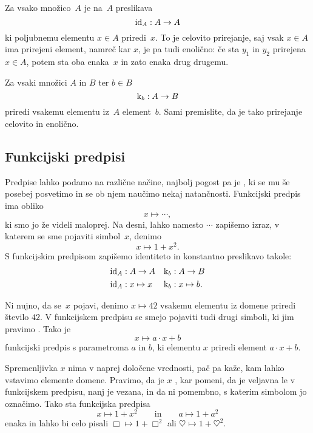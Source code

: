Za vsako množico~$A$ je  na~$A$ preslikava
%
\begin{equation*}
  \id[A] : A \to A
\end{equation*}
%
ki poljubnemu elementu $x \in A$ priredi~$x$. To je celovito prirejanje, saj vsak
$x \in A$ ima prirejeni element, namreč kar $x$, je pa tudi enolično: če sta $y_1$ in
$y_2$ prirejena $x \in A$, potem sta oba enaka~$x$ in zato enaka drug drugemu.

Za vsaki množici $A$ in $B$ ter $b \in B$ 
%
\begin{equation*}
  \konst{b} : A \to B
\end{equation*}
%
priredi vsakemu elementu iz~$A$ element~$b$. Sami premislite, da je tako prirejanje
celovito in enolično.

\subsection{Funkcijski predpisi}
\label{sec:funkcijski-predpisi}

Predpise lahko podamo na različne načine, najbolj pogost pa je , ki
se mu še posebej posvetimo in se ob njem naučimo nekaj natančnosti. Funkcijski predpis ima
obliko
%
\begin{equation*}
  x \mapsto \cdots,
\end{equation*}
%
ki smo jo že videli maloprej. Na desni, lahko namesto $\cdots$ zapišemo izraz, v katerem
se sme pojaviti simbol~$x$, denimo
%
\begin{equation*}
  x \mapsto 1 + x^2.
\end{equation*}
%
S funkcijskim predpisom zapišemo identiteto in konstantno preslikavo takole:
%
\begin{align*}
  \id[A] &: A \to A
  &
  \konst{b} &: A \to B
  \\
  \id[A] &: x \mapsto x
  &
  \konst{b} &: x \mapsto b.
\end{align*}

Ni nujno, da se~$x$ pojavi, denimo $x \mapsto 42$ vsakemu elementu iz domene priredi
število $42$. V funkcijskem predpisu se smejo pojaviti tudi drugi simboli, ki jim
pravimo . Tako je
%
\begin{equation*}
  x \mapsto a \cdot x + b
\end{equation*}
%
funkcijski predpis s parametroma $a$ in $b$, ki elementu $x$ priredi element $a \cdot x + b$.

Spremenljivka $x$ nima v naprej določene vrednosti, pač pa kaže, kam lahko vstavimo
elemente domene. Pravimo, da je $x$ , kar pomeni, da je veljavna
le v funkcijskem predpisu, nanj je vezana, in da ni pomembno, s katerim simbolom jo
označimo. Tako sta funkcijska predpisa
%
\begin{equation*}
  x \mapsto 1 + x^2
  \qquad\text{in}\qquad
  a \mapsto 1 + a^2
\end{equation*}
%
enaka in lahko bi celo pisali $\Box \mapsto 1 + \Box^2$ ali
$\heartsuit \mapsto 1 + \heartsuit^2$.

